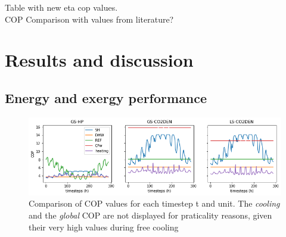 \documentclass{article}
\begin{document}
Table with new eta cop values.\\

COP Comparison with values from literature?\\



\section{Results and discussion}

\subsection{Energy and exergy performance}

\begin{figure}[tph]
	\centering
	\includegraphics[width=1\linewidth]{Images/V_COP}
	\caption{Comparison of COP values for each timestep t and unit. The \textit{cooling } and the \textit{global} COP are not displayed for praticality reasons, given their very high values during free cooling}
	\label{fig:v_cop}
\end{figure}
\end{document}
